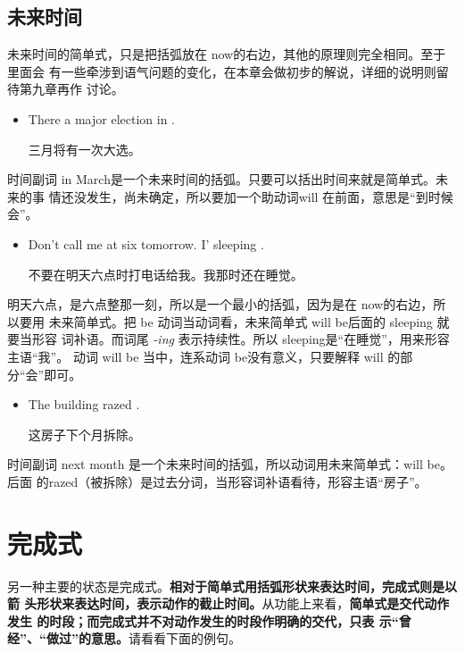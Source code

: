 \subsection{未来时间}

未来时间的简单式，只是把括弧放在 now的右边，其他的原理则完全相同。至于里面会
有一些牵涉到语气问题的变化，在本章会做初步的解说，详细的说明则留待第九章再作
讨论。

\begin{itemize}
\item  There  a major election in .

  三月将有一次大选。
\end{itemize}

时间副词 in March是一个未来时间的括弧。只要可以括出时间来就是简单式。未来的事
情还没发生，尚未确定，所以要加一个助动词will 在前面，意思是“到时候会”。

\begin{itemize}
\item  Don't call me at six tomorrow. I' sleeping
  .

  不要在明天六点时打电话给我。我那时还在睡觉。
\end{itemize}

明天六点，是六点整那一刻，所以是一个最小的括弧，因为是在 now的右边，所以要用
未来简单式。把 be 动词当动词看，未来简单式 will be后面的 sleeping 就要当形容
词补语。而词尾 \emph{-ing} 表示持续性。所以 sleeping是“在睡觉”，用来形容主语“我”。
动词 will be 当中，连系动词 be没有意义，只要解释 will 的部分“会”即可。

\begin{itemize}
\item  The building  razed .

  这房子下个月拆除。
\end{itemize}

时间副词 next month 是一个未来时间的括弧，所以动词用未来简单式：will be。后面
的razed（被拆除）是过去分词，当形容词补语看待，形容主语“房子”。

\section{完成式}

另一种主要的状态是完成式。\textbf{相对于简单式用括弧形状来表达时间，完成式则是以箭
  头形状来表达时间，表示动作的截止时间。}从功能上来看，\textbf{简单式是交代动作发生
  的时段；而完成式并不对动作发生的时段作明确的交代，只表
  示“曾经”、“做过”的意思。}请看看下面的例句。

